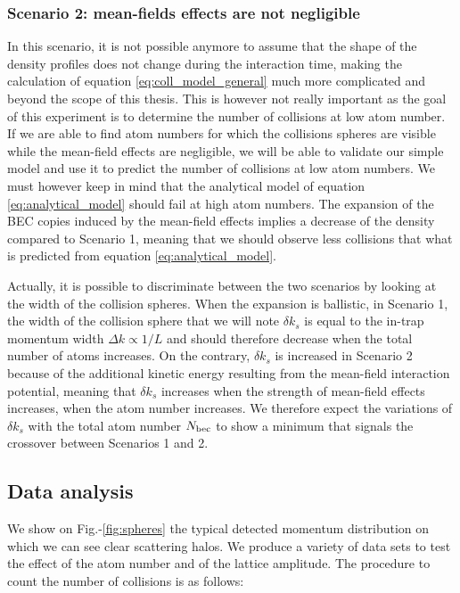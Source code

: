 \subsubsection{Scenario 2: mean-fields effects are not negligible}

In this scenario, it is not possible anymore to assume that the shape of the density profiles does not change during the interaction time, making the calculation of equation \ref{eq:coll_model_general} much more complicated and beyond the scope of this thesis. This is however not really important as the goal of this experiment is to determine the number of collisions at low atom number. If we are able to find atom numbers for which the collisions spheres are visible while the mean-field effects are negligible, we will be able to validate our simple model and use it to predict the number of collisions at low atom numbers. We must however keep in mind that the analytical model of equation \ref{eq:analytical_model} should fail at high atom numbers. The expansion of the BEC copies induced by the mean-field effects implies a decrease of the density compared to Scenario 1, meaning that we should observe less collisions that what is predicted from equation \ref{eq:analytical_model}.

Actually, it is possible to discriminate between the two scenarios by looking at the width of the collision spheres. When the expansion is ballistic, \ie in Scenario 1, the width of the collision sphere that we will note $\delta k_s$ is equal to the in-trap momentum width $\Delta k \propto 1/L$ and should therefore decrease when the total number of atoms increases. On the contrary, $\delta k_s$ is increased in Scenario 2 because of the additional kinetic energy resulting from the mean-field interaction potential, meaning that $\delta k_s$ increases when the strength of mean-field effects increases, \ie when the atom number increases. We therefore expect the variations of $\delta k_s$ with the total atom number $N_{\rm{bec}}$ to show a minimum that signals the crossover between Scenarios 1 and 2.

\subsection{Data analysis}

\label{sec:data_analysis_collisions}

We show on Fig.-\ref{fig:spheres} the typical detected momentum distribution on which we can see clear scattering halos. We produce a variety of data sets to test the effect of the atom number and of the lattice amplitude. The procedure to count the number of collisions is as follows:


